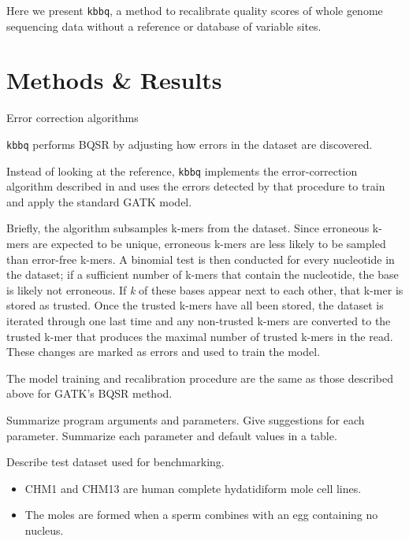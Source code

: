 \documentclass{article}
\begin{document}
\begin{outline}
\begin{outline}
		\end{outline}
	\item Here we present \texttt{kbbq}, a method to recalibrate quality scores of whole genome sequencing data without a reference or database of variable sites.
\end{outline}
\section{Methods \& Results}
\begin{outline}
	\item Error correction algorithms
	\item \texttt{kbbq} performs BQSR by adjusting how errors in the dataset are discovered.
	\begin{outline}
		\item Instead of looking at the reference, \texttt{kbbq} implements the error-correction algorithm described in \cite{song_lighter_2014} and uses the errors detected by that procedure to train and apply the standard GATK model.
		\item Briefly, the algorithm subsamples k-mers from the dataset. Since erroneous k-mers are expected to be unique, erroneous k-mers are less likely to be sampled than error-free k-mers. A binomial test is then conducted for every nucleotide in the dataset; if a sufficient number of k-mers that contain the nucleotide, the base is likely not erroneous. If \textit{k} of these bases appear next to each other, that k-mer is stored as trusted. Once the trusted k-mers have all been stored, the dataset is iterated through one last time and any non-trusted k-mers are converted to the trusted k-mer that produces the maximal number of trusted k-mers in the read. These changes are marked as errors and used to train the model.
		\item The model training and recalibration procedure are the same as those described above for GATK's BQSR method.
	\end{outline}
	\item Summarize program arguments and parameters. Give suggestions for each parameter. Summarize each parameter and default values in a table.
	\item Describe test dataset used for benchmarking.
	\begin{itemize}
		\item CHM1 and CHM13 are human complete hydatidiform mole cell lines.
		\item The moles are formed when a sperm combines with an egg containing no nucleus.

\end{itemize}
\end{outline}
\end{document}
